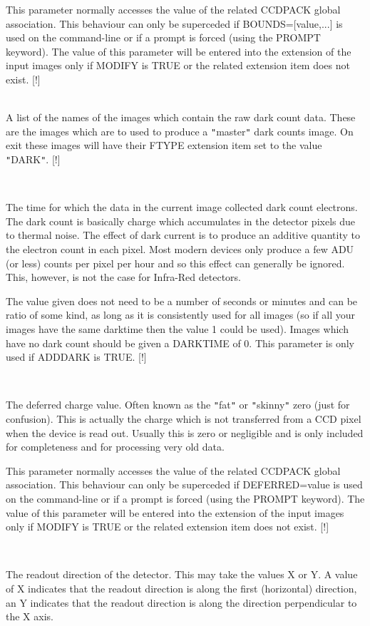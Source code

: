 \documentclass[twoside,11pt]{article}
\renewcommand{\_}{\texttt{\symbol{95}}}
\newcommand{\qt}[1]{{\tt "}#1{\tt "}}
\newcommand{\sstsubsection}[1]{ \item[{#1}] \mbox{} \\}
\newcommand{\sstsubsection}[1]{\item[{#1}]}
\begin{document}
{{{         This parameter normally accesses the value of the related
         CCDPACK global association. This behaviour can only be
         superceded if BOUNDS=[value,...] is used on the command-line
         or if a prompt is forced (using the PROMPT keyword). The
         value of this parameter will be entered into the extension of
         the input images only if MODIFY is TRUE or the related extension
         item does not exist.
         [!]
      }
      \sstsubsection{
         DARK = LITERAL (Read)
      } {
         A list of the names of the images which contain the raw dark
         count data. These are the images which are to used to produce a
         \qt{master} dark counts image. On exit these images will have their
         FTYPE extension item set to the value \qt{DARK}.
         [!]
      }
      \sstsubsection{
         DARKTIME = \_DOUBLE (Read)
      } {
         The time for which the data in the current image collected dark
         count electrons. The dark count is basically charge which
         accumulates in the detector pixels due to thermal noise. The
         effect of dark current is to produce an additive quantity to
         the electron count in each pixel. Most modern devices only
         produce a few ADU (or less) counts per pixel per hour and so
         this effect can generally be ignored. This, however, is not
         the case for Infra-Red detectors.

         The value given does not need to be a number of seconds or
         minutes and can be ratio of some kind, as long as it is
         consistently used for all images (so if all your images have the
         same darktime then the value 1 could be used). Images which have
         no dark count should be given a DARKTIME of 0. This parameter
         is only used if ADDDARK is TRUE.
         [!]
      }
      \sstsubsection{
         DEFERRED = \_DOUBLE (Read)
      } {
         The deferred charge value. Often known as the \qt{fat} or \qt{skinny}
         zero (just for confusion). This is actually the charge which is
         not transferred from a CCD pixel when the device is read out.
         Usually this is zero or negligible and is only included for
         completeness and for processing very old data.

         This parameter normally accesses the value of the related
         CCDPACK global association. This behaviour can only be
         superceded if DEFERRED=value is used on the command-line
         or if a prompt is forced (using the PROMPT keyword). The
         value of this parameter will be entered into the extension of
         the input images only if MODIFY is TRUE or the related extension
         item does not exist.
         [!]
      }
      \sstsubsection{
         DIRECTION = LITERAL (Read)
      } {
         The readout direction of the detector. This may take the values
         X or Y.  A value of X indicates that the readout direction is
         along the first (horizontal) direction, an Y indicates that
         the readout direction is along the direction perpendicular to
         the X axis.

}}}
\end{document}
